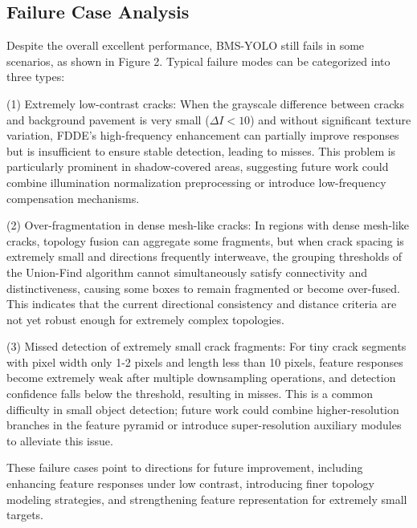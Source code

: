 \documentclass[twocolumn]{sn-jnl}
\begin{document}
	\subsection{Failure Case Analysis}
	Despite the overall excellent performance, BMS-YOLO still fails in some scenarios, as shown in Figure 2. Typical failure modes can be categorized into three types:
	
	(1) Extremely low-contrast cracks: When the grayscale difference between cracks and background pavement is very small ($\Delta I < 10$) and without significant texture variation, FDDE's high-frequency enhancement can partially improve responses but is insufficient to ensure stable detection, leading to misses. This problem is particularly prominent in shadow-covered areas, suggesting future work could combine illumination normalization preprocessing or introduce low-frequency compensation mechanisms.
	
	(2) Over-fragmentation in dense mesh-like cracks: In regions with dense mesh-like cracks, topology fusion can aggregate some fragments, but when crack spacing is extremely small and directions frequently interweave, the grouping thresholds of the Union-Find algorithm cannot simultaneously satisfy connectivity and distinctiveness, causing some boxes to remain fragmented or become over-fused. This indicates that the current directional consistency and distance criteria are not yet robust enough for extremely complex topologies.
	
	(3) Missed detection of extremely small crack fragments: For tiny crack segments with pixel width only 1-2 pixels and length less than 10 pixels, feature responses become extremely weak after multiple downsampling operations, and detection confidence falls below the threshold, resulting in misses. This is a common difficulty in small object detection; future work could combine higher-resolution branches in the feature pyramid or introduce super-resolution auxiliary modules to alleviate this issue.
	
	These failure cases point to directions for future improvement, including enhancing feature responses under low contrast, introducing finer topology modeling strategies, and strengthening feature representation for extremely small targets.
	
\end{document}
